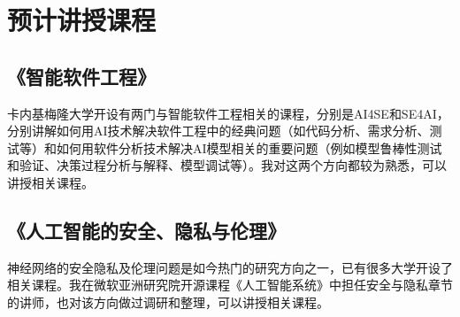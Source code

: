 \documentclass[12pt]{article}
\begin{document}
\section{预计讲授课程}

\subsection{《智能软件工程》}
卡内基梅隆大学开设有两门与智能软件工程相关的课程，分别是AI4SE\cite{cmu:ai4se}和SE4AI\cite{cmu:se4ai}，分别讲解如何用AI技术解决软件工程中的经典问题（如代码分析、需求分析、测试等）和如何用软件分析技术解决AI模型相关的重要问题（例如模型鲁棒性测试和验证、决策过程分析与解释、模型调试等）。我对这两个方向都较为熟悉，可以讲授相关课程。

\subsection{《人工智能的安全、隐私与伦理》}
神经网络的安全隐私及伦理问题是如今热门的研究方向之一，已有很多大学开设了相关课程\cite{ucb:trustworthy,ucb:fairness}。我在微软亚洲研究院开源课程《人工智能系统》\cite{microsoft:ai-system}中担任安全与隐私章节的讲师，也对该方向做过调研和整理，可以讲授相关课程。


{


}
\end{document}

